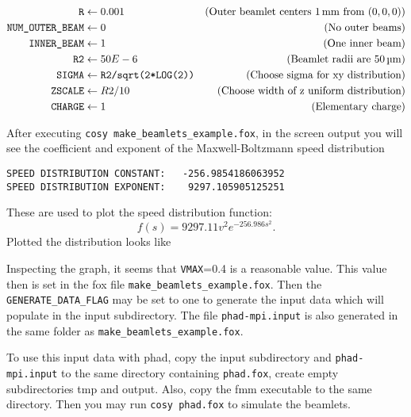\documentclass[12pt]{article}
\begin{document}
\begin{align*}
\texttt{R} & \gets 0.001 & (\text{Outer beamlet centers \SI{1}{\milli\metre} from }(0,0,0))\\
\texttt{NUM{\_}OUTER{\_}BEAM} &\gets 0& (\text{No outer beams})\\
\texttt{INNER{\_}BEAM} &\gets 1 & (\text{One inner beam})\\
\texttt{R2} & \gets 50E-6 & (\text{Beamlet radii are \SI{50}{\micro\metre}} )\\
\texttt{SIGMA}  & \gets \texttt{R2/sqrt(2*LOG(2))} & (\text{Choose sigma for xy distribution} )\\
\texttt{ZSCALE} & \gets R2/10 & (\text{Choose width of z uniform distribution} )\\
\texttt{CHARGE} & \gets 1 & (\text{Elementary charge} )
\end{align*}

After executing \texttt{cosy make{\_}beamlets{\_}example.fox}, in the screen output you will see the coefficient and exponent of the Maxwell-Boltzmann speed distribution
\begin{lstlisting}
SPEED DISTRIBUTION CONSTANT:   -256.9854186063952
SPEED DISTRIBUTION EXPONENT:    9297.105905125251
\end{lstlisting}
These are used to plot the speed distribution function:
\[f(s)=9297.11v^2e^{-256.986s^2}.\]
Plotted the distribution looks like

\hspace*{\fill}
\hspace*{\fill}

Inspecting the graph, it seems that \texttt{VMAX}=0.4 is a reasonable value.  This value then is set in the fox file \texttt{make{\_}beamlets{\_}example.fox}.  Then the \texttt{GENERATE{\_}DATA{\_}FLAG} may be set to one to generate the input data which will populate in the input subdirectory.  The file \texttt{phad-mpi.input} is also generated in the same folder as \texttt{make{\_}beamlets{\_}example.fox}.

To use this input data with phad, copy the input subdirectory and \texttt{phad-mpi.input} to the same directory containing \texttt{phad.fox}, create empty subdirectories tmp and output.  Also, copy the fmm executable to the same directory.  Then you may run \texttt{cosy phad.fox} to simulate the beamlets.
\end{document}
